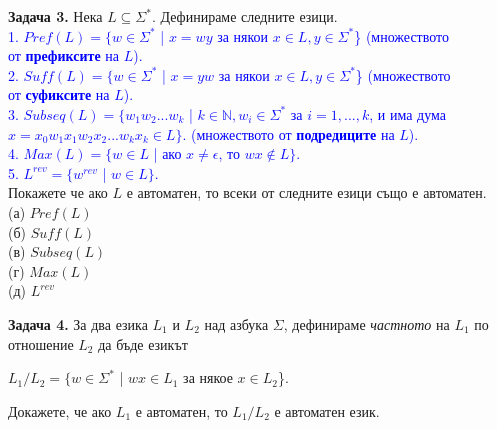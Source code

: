 \documentclass{article}
\begin{document}
    \textbf{Задача 3.} Нека $L \subseteq \Sigma^*$. Дефинираме следните езици. \\
    \textcolor{blue}{\hspace{10pt} 1. $Pref(L) = \{w \in \Sigma^*$ | $x = wy$ за някои $x \in L, y \in \Sigma^*$\}
    (множеството \\ \hspace{22pt} от \textbf{префиксите} на $L$). \\
    \hspace{10pt} 2. $Suff(L) = \{w \in \Sigma^*$ | $x = yw$ за някои $x \in L, y \in \Sigma^*$\}
    (множеството \\ \hspace{22pt} от \textbf{суфиксите} на $L$). \\
    \hspace{10pt} 3. $Subseq(L) = \{w_1w_2...w_k$ | $k \in \mathbb{N}, w_i \in \Sigma^*$ за $i = 1,...,k$,
    и има дума \\ \hspace{22pt} $x = x_0w_1x_1w_2x_2...w_kx_k \in L\}$. (множеството от \textbf{подредиците}
    на $L$). \\
    \hspace{10pt} 4. $Max(L) = \{w \in L$ | ако $x \neq \epsilon$, то $wx \notin L\}$. \\
    \hspace{10pt} 5. $L^{rev} = \{w^{rev}$ | $w \in L\}$.} \\
    Покажете че ако $L$ е автоматен, то всеки от следните езици също е автоматен. \\
    (а) $Pref(L)$ \\
    (б) $Suff(L)$ \\
    (в) $Subseq(L)$ \\
    (г) $Max(L)$ \\
    (д) $L^{rev}$

    \vspace{15pt}

    \textbf{Задача 4.} За два езика $L_1$ и $L_2$ над азбука $\Sigma$, дефинираме 
    \textit{частното} на $L_1$ по отношение $L_2$ да бъде езикът 
    \begin{center}
      $L_1/L_2 = \{w \in \Sigma^*$ | $wx \in L_1$ за някое $x \in L_2$\}.
    \end{center}
    Докажете, че ако $L_1$ е автоматен, то $L_1/L_2$ е автоматен език.


\vspace{25pt}
\end{document}
